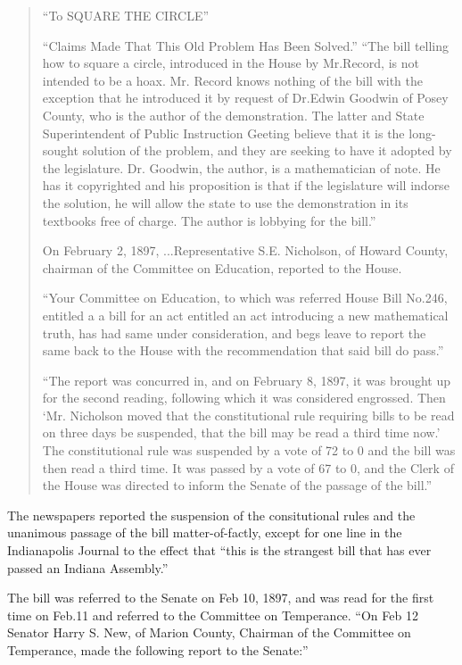 \begin{quote}
                        ``To SQUARE THE CIRCLE''

``Claims Made That This Old Problem Has Been Solved.''
``The bill telling how to square a circle, introduced in the House by
Mr.Record, is not intended to be a hoax. Mr. Record knows nothing of the bill
with the exception that he introduced it by request of Dr.Edwin Goodwin of
Posey County, who is the author of the demonstration. The latter and State
Superintendent of Public Instruction Geeting believe that it is the long-sought
solution of the problem, and they are seeking to have it adopted by the
legislature. Dr. Goodwin, the author, is a mathematician of note. He has it
copyrighted and his proposition is that if the legislature will indorse the
solution, he will allow the state to use the demonstration in its textbooks
free of charge. The author is lobbying for the bill.''

On February 2, 1897, ...Representative S.E. Nicholson, of Howard County,
chairman of the Committee on Education, reported to the House.


``Your Committee on Education, to which was referred House Bill No.246,
entitled a a bill for an act entitled an act introducing a new mathematical
truth, has had same under consideration, and begs leave to report the same
back to the House with the recommendation that said bill do pass.''

``The report was concurred in, and on February 8, 1897, it was brought up for 
the
second reading, following which it was considered engrossed. Then
`Mr. Nicholson moved that the constitutional rule requiring bills to be read
on three days be suspended, that the bill may be read a third time now.' The
constitutional rule was suspended by a vote of 72 to 0 and the bill was then
read a third time. It was passed by a vote of 67  to 0, and the Clerk of the
House was directed to inform the Senate of the passage of the bill.''

\end{quote}

The newspapers reported the suspension of the consitutional rules and
the unanimous passage of the bill matter-of-factly, except for one line
in the Indianapolis Journal to the effect that ``this is the strangest
bill that has ever passed an Indiana Assembly.''


The bill was referred to the Senate on Feb 10, 1897, and was read for the first
time on Feb.11 and referred to the Committee on Temperance. ``On Feb 12
Senator Harry S. New, of Marion County, Chairman of the Committee on
Temperance, made the following report to the Senate:''


